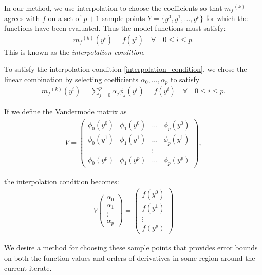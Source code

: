 \documentclass{article}
\theoremstyle{case}
\numberwithin{theorem}{subsection}
\newcommand{\mfk}{{{m}_f}^{(k)}}
\begin{document}
In our method, we use interpolation to choose the coefficients so that $\mfk$ agrees with $f$ on a set of $p+1$ sample points $Y = \{y^0, y^1, \ldots, y^p\}$ for which the functions have been evaluated.
Thus the model functions must satisfy:
\begin{align}
\label{interpolation_condition}
\mfk(y^i) = f(y^i) \quad \forall \quad 0 \le i \le p.
\end{align}
This is known as the \emph{interpolation condition}.

To satisfy the interpolation condition \cref{interpolation_condition}, we chose the linear combination by selecting coefficients $\alpha_0, \ldots, \alpha_p$ to satisfy
\begin{align}
\label{interpolation_formula}
    \mfk(y^i) = \sum^p_{j=0}\alpha_j\phi_j(y^i) = f(y^i) \quad \forall \quad 0 \le i \le p.
\end{align}

If we define the Vandermode matrix as
\begin{align}
\label{vandermonde}
V=
\begin{pmatrix}
    \phi_0(y^0)      & \phi_1(y^0)       & \ldots & \phi_{p}(y^0)      \\
    \phi_0(y^1)      & \phi_1(y^1)       & \dots  & \phi_{p}(y^1)      \\
                     &                   & \vdots &                    \\
    \phi_0(y^{p})    & \phi_1(y^{p})     & \ldots & \phi_{p}(y^{p})
\end{pmatrix},
\end{align}

the interpolation condition becomes:
\begin{align}
\label{matrix_form}
V
\begin{pmatrix}
    \alpha_0     \\
    \alpha_1     \\
    \vdots       \\
    \alpha_p
\end{pmatrix}
=
\begin{pmatrix}
    f(y^0)     \\
    f(y^1)     \\
    \vdots     \\
    f(y^p)
\end{pmatrix}
\end{align}

We desire a method for choosing these sample points that provides error bounds on both 
the function values and orders of derivatives in some region around the current iterate.
\end{document}
